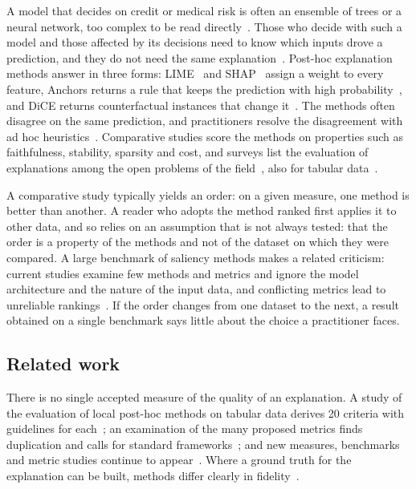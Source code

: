 \documentclass[10pt,a4paper,twocolumn]{article}
\begin{document}
A model that decides on credit or medical risk is often an ensemble of trees or a neural
network, too complex to be read directly~\cite{cerneviciene2024finance}. Those who decide
with such a model and those affected by its decisions need to know which inputs drove a
prediction, and they do not need the same explanation~\cite{kim2024stakeholder}. Post-hoc
explanation methods answer in three forms: LIME~\cite{ribeiro2016why} and
SHAP~\cite{lundberg2017unified} assign a weight to every feature, Anchors returns a rule
that keeps the prediction with high probability~\cite{ribeiro2018anchors}, and DiCE
returns counterfactual instances that change it~\cite{mothilal2020dice}. The methods
often disagree on the same prediction, and practitioners resolve the disagreement with
ad hoc heuristics~\cite{krishna2022disagreement}. Comparative studies score the methods
on properties such as faithfulness, stability, sparsity and cost, and surveys list the
evaluation of explanations among the open problems of the
field~\cite{longo2024manifesto,mersha2024survey}, also for tabular
data~\cite{obrienquinn2024tabular,santana2026tabular}.

A comparative study typically yields an order: on a given measure, one method is better
than another. A reader who adopts the method ranked first applies it to other data, and
so relies on an assumption that is not always tested: that the order is a property of
the methods and not of the dataset on which they were compared. A large benchmark of
saliency methods makes a related criticism: current studies examine few methods and
metrics and ignore the model architecture and the nature of the input data, and
conflicting metrics lead to unreliable rankings~\cite{klein2024maze}. If the order
changes from one dataset to the next, a result obtained on a single benchmark says
little about the choice a practitioner faces.

\subsection{Related work}

There is no single accepted measure of the quality of an explanation. A study of the
evaluation of local post-hoc methods on tabular data derives 20 criteria with guidelines
for each~\cite{velmurugan2025guidelines}; an examination of the many proposed metrics
finds duplication and calls for standard frameworks~\cite{pawlicki2024metrics}; and new
measures, benchmarks and metric studies continue to
appear~\cite{bello2025strength,sithakoul2024beexai,pereira2026local}. Where a ground
truth for the explanation can be built, methods differ clearly in
fidelity~\cite{mironicolau2024fidelity}.
\end{document}
